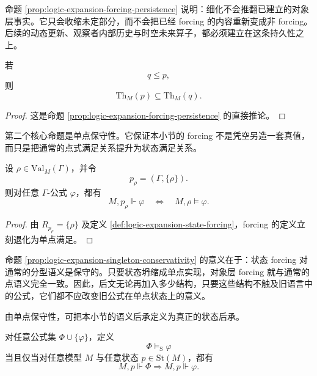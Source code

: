 命题 \ref{prop:logic-expansion-forcing-persistence} 说明：细化不会推翻已建立的对象层事实。它只会收缩未定部分，而不会把已经 forcing 的内容重新变成非 forcing。后续的动态更新、观察者内部历史与时空未来算子，都必须建立在这条持久性之上。

\begin{corollary}[状态理论的单调增长]\label{cor:logic-expansion-state-theory-monotonicity}
若
\[
q\le p,
\]
则
\[
\mathrm{Th}_M(p)\subseteq \mathrm{Th}_M(q).
\]
\end{corollary}

\begin{proof}
这是命题 \ref{prop:logic-expansion-forcing-persistence} 的直接推论。
\end{proof}

第二个核心命题是单点保守性。它保证本小节的 forcing 不是凭空另造一套真值，而只是把通常的点式满足关系提升为状态满足关系。

\begin{proposition}[单点保守性]\label{prop:logic-expansion-singleton-conservativity}
设 \(\rho\in \mathrm{Val}_M(\Gamma)\)，并令
\[
p_\rho=(\Gamma,\{\rho\}).
\]
则对任意 \(\Gamma\)-公式 \(\varphi\)，都有
\[
M,p_\rho\Vdash \varphi
\quad\Longleftrightarrow\quad
M,\rho\models \varphi.
\]
\end{proposition}

\begin{proof}
由 \(R_{p_\rho}=\{\rho\}\) 及定义 \ref{def:logic-expansion-state-forcing}，forcing 的定义立刻退化为单点满足。
\end{proof}

命题 \ref{prop:logic-expansion-singleton-conservativity} 的意义在于：状态 forcing 对通常的分型语义是保守的。只要状态坍缩成单点实现，对象层 forcing 就与通常的点语义完全一致。因此，后文无论再加入多少结构，只要这些结构不触及旧语言中的公式，它们都不应改变旧公式在单点状态上的意义。

由单点保守性，可把本小节的语义后承定义为真正的状态后承。

\begin{definition}[状态语义后承]\label{def:logic-expansion-state-consequence}
对任意公式集 \(\Phi\cup\{\varphi\}\)，定义
\[
\Phi \models_{\mathrm{S}} \varphi
\]
当且仅当对任意模型 \(M\) 与任意状态 \(p\in \mathrm{St}(M)\)，都有
\[
M,p\Vdash \Phi
\Rightarrow
M,p\Vdash \varphi.
\]
\end{definition}

